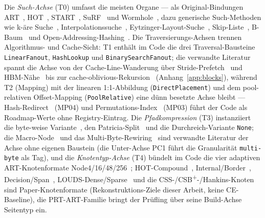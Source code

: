 \begin{nurlang}
Die \emph{Such-Achse} (T0) umfasst die meisten Organe --- als Original-Bindungen ART~\cite{leis2013art},
HOT~\cite{binna2018hot}, START~\cite{fent2020start}, SuRF~\cite{zhang2018surf} und
Wormhole~\cite{wu2019wormhole}, dazu generische Such-Methoden wie k-äre Suche~\cite{schlegel2009kary},
Interpolationssuche~\cite{perl1978interpolation}, Eytzinger-Layout-Suche~\cite{khuong2017eytzinger},
Skip-Liste~\cite{pugh1990skiplist}, B-Baum~\cite{bayer1972btree} und
Open-Addressing-Hashing~\cite{knuth1998taocp3}. Die Traversierungs-Achsen trennen
Algorithmus- und Cache-Sicht: T1 enthält im Code die drei Traversal-Bausteine
\texttt{Linear\allowbreak{}Fanout}, \texttt{Hash\allowbreak{}Lookup} und
\texttt{Binary\allowbreak{}Search\allowbreak{}Fanout}; die verwandte Literatur spannt die Achse von der
Cache-Line-Wanderung über Stride-Prefetch~\cite{chen2001prefetch} und HBM-Nähe~\cite{schmidt2025hbm} bis
zur cache-oblivious-Rekursion~\cite{frigo1999cache} (Anhang~\ref{app:blocks}), während T2 (Mapping)
mit der linearen 1:1-Abbildung (\texttt{Direct\allowbreak{}Placement}) und dem pool-relativen
Offset-Mapping (\texttt{Pool\allowbreak{}Relative}) eine dünn besetzte Achse bleibt ---
Hash-Redirect~\cite{wu2019wormhole} (MP04) und Permutations-Index~\cite{mao2012masstree} (MP03) führt
der Code als Roadmap-Werte ohne Registry-Eintrag. Die \emph{Pfadkompression} (T3)
instanziiert die byte-weise Variante~\cite{leis2013art}, den Patricia-Split~\cite{morrison1968patricia,binna2018hot}
und die Durchreich-Variante \texttt{None}; die Macro-Node~\cite{boffa2024coco} und das
Multi-Byte-Rewiring~\cite{fent2020start} sind verwandte Literatur der Achse ohne eigenen Baustein (die
Unter-Achse PC1 führt die Granularität \texttt{multi-byte} als Tag), und die
\emph{Knotentyp-Achse} (T4) bündelt im Code die vier adaptiven ART-Knotenformate
Node4/16/48/256~\cite{leis2013art}; HOT-Compound~\cite{binna2018hot}, Internal/Border~\cite{mao2012masstree},
Decision/Span~\cite{schmeisser2022b2tree}, LOUDS-Dense/Sparse~\cite{zhang2018surf} und die
CSS-/CSB\textsuperscript{+}-/Hankins-Knoten sind Paper-Knotenformate (Rekonstruktions-Ziele dieser
Arbeit, keine CE-Baseline), die PRT-ART-Familie bringt der Prüfling über seine Build-Achse Seitentyp ein.
\end{nurlang}
